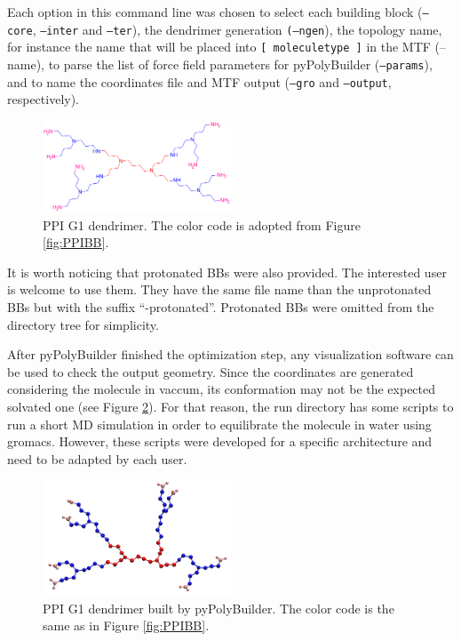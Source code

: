 Each option in this command line was chosen to select each building block (\texttt{--core}, \texttt{--inter} and \texttt{--ter}),  the dendrimer generation \texttt{(--ngen}), the topology name, for instance the name that will be placed into \texttt{[ moleculetype ]} in the MTF 
(--name), to parse the list of force field parameters for pyPolyBuilder (\texttt{--params}), and to name the coordinates file and MTF output (\texttt{--gro} and \texttt{--output}, respectively).

\begin{figure}
    \centering
    \includegraphics[width=0.5\textwidth]{PPI/PPIG1.png}
    \caption{PPI G1 dendrimer.
             The color code is adopted from Figure \ref{fig:PPIBB}.}
    \label{fig:PPIG1}
\end{figure}

It is worth noticing that protonated BBs were also provided.
The interested user is welcome to use them.
They have the same file name than the unprotonated BBs but with the suffix ``-protonated''.
Protonated BBs were omitted from the directory tree for simplicity.

After pyPolyBuilder finished the optimization step, any visualization software can be used to check the output geometry. 
Since the coordinates are generated considering the molecule in vaccum, its conformation may not be the expected solvated one (see Figure \ref{fig:PPIG1PPB}).
For that reason, the run directory has some scripts to run a short MD simulation in order to equilibrate the molecule in water using gromacs.
However, these scripts were developed for a specific architecture and need to be adapted by each user.

\begin{figure}
    \centering
    \includegraphics[width=0.5\textwidth]{PPI/PPI.pdf}
    \caption{PPI G1 dendrimer built by pyPolyBuilder.
             The color code is the same as in Figure \ref{fig:PPIBB}.}
    \label{fig:PPIG1PPB}
\end{figure}

